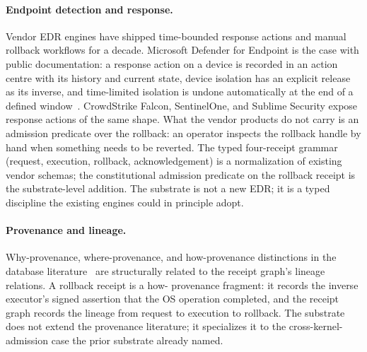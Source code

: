 \paragraph{Endpoint detection and response.}
Vendor EDR engines have shipped time-bounded response actions and
manual rollback workflows for a decade. Microsoft Defender for
Endpoint is the case with public documentation: a response action on a
device is recorded in an action centre with its history and current
state, device isolation has an explicit release as its inverse, and
time-limited isolation is undone automatically at the end of a defined
window~\cite{microsoftDefenderResponseActions}. CrowdStrike Falcon,
SentinelOne, and Sublime Security expose response actions of the same
shape. What the vendor products do not carry is an admission predicate
over the rollback: an operator inspects the rollback handle by hand
when something needs to be reverted. The
typed four-receipt grammar (request, execution, rollback,
acknowledgement) is a normalization of existing vendor schemas; the
constitutional admission predicate on the rollback receipt is the
substrate-level addition. The substrate is not a new EDR; it is a
typed discipline the existing engines could in principle adopt.

\paragraph{Provenance and lineage.}
Why-provenance, where-provenance, and how-provenance distinctions in
the database literature~\cite{cheney2009provenance} are structurally related to
the receipt graph's lineage relations. A rollback receipt is a how-
provenance fragment: it records the inverse executor's signed
assertion that the OS operation completed, and the receipt graph
records the lineage from request to execution to rollback. The
substrate does not extend the provenance literature; it specializes
it to the cross-kernel-admission case the prior substrate
\cite{programmableSovereigntyAnonymous} already named.

